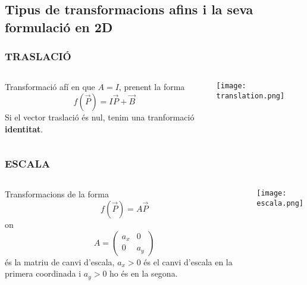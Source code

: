 \documentclass{beamer}
\begin{document}
\subsection{Tipus de transformacions afins i la seva formulació en 2D}
\begin{frame}
  \frametitle{TRASLACIÓ}
  \begin{columns}
    \begin{column}{0.5\textwidth}
      \begin{definicio}
        Transformació afí en que $A=I$, prenent la forma
        \[
        f(\overrightarrow{P})=I \overrightarrow{P} + \overrightarrow{B}
        \]
        Si el vector traslació és nul, tenim una tranformació {\bf identitat}.
      \end{definicio}
    \end{column}
    \begin{column}{0.5\textwidth}
      \begin{center}
        \texttt{[image: translation.png]}
      \end{center}
    \end{column}
  \end{columns}
\end{frame}
\begin{frame}
  \frametitle{ESCALA}
  \begin{columns}
    \begin{column}{0.5\textwidth}
      \begin{definicio}
        Transformacions de la forma
        \[
        f(\overrightarrow{P})=A \overrightarrow{P}
        \]
        on
        \[
        A = \begin{pmatrix}a_x&0\\0&a_y\end{pmatrix}
        \]
        és la matriu de canvi d'escala, $a_x>0$ és el canvi d'escala en la primera coordinada i $a_y>0$ ho és en la segona.
      \end{definicio}
    \end{column}
    \begin{column}{0.5\textwidth}
      \begin{center}
        \texttt{[image: escala.png]}
      \end{center}
    \end{column}
  \end{columns}
\end{frame}
\end{document}
